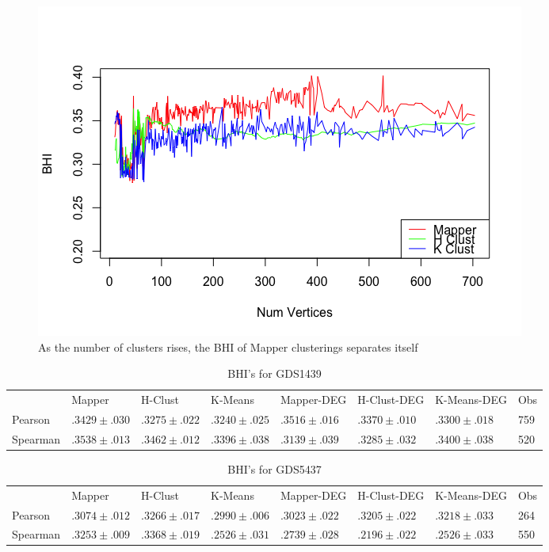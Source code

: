 \documentclass[preprint,10pt]{elsarticle}
\begin{document}
\begin{figure}
  \includegraphics[width=\linewidth]{plotTrend}
  \caption{As the number of clusters rises, the BHI of Mapper clusterings separates itself}
  \label{bhi-trend}
\end{figure}

	
\begin{table}[]
\centering
\caption{BHI's for GDS1439}
\label{table-bhi-1439}
\begin{tabular}{llllllll}
         & Mapper            & H-Clust           & K-Means           & Mapper-DEG        &  H-Clust-DEG        & K-Means-DEG       & Obs \\
Pearson  & $.3429 \pm .030$ & $.3275 \pm .022$ & $.3240 \pm .025$ & $ .3516 \pm .016$ & $ .3370 \pm .010 $ & $ .3300 \pm .018 $ & 759 \\
Spearman & $.3538 \pm.013$  & $.3462 \pm .012$  & $.3396 \pm .038$ & $ .3139 \pm .039$ & $ .3285 \pm .032$  & $ .3400 \pm .038 $ & 520
\end{tabular}
\end{table}

\begin{table}[]
\centering
\caption{BHI's for GDS5437}
\label{table-bhi-5437}
\begin{tabular}{llllllll}
         & Mapper            & H-Clust           & K-Means           & Mapper-DEG        & H-Clust-DEG       & K-Means-DEG       & Obs \\
Pearson  & $.3074  \pm .012$ & $.3266 \pm .017 $ & $ .2990 \pm .006$ & $ .3023 \pm .022$ & $ .3205 \pm .022$ & $ .3218 \pm .033$ & 264 \\
Spearman & $.3253 \pm .009$  & $ .3368 \pm.019 $  & $.2526 \pm .031$  & $ .2739 \pm .028$ & $ .2196 \pm .022$ & $ .2526 \pm .033$ & 550
\end{tabular}
\end{table}
\end{document}
